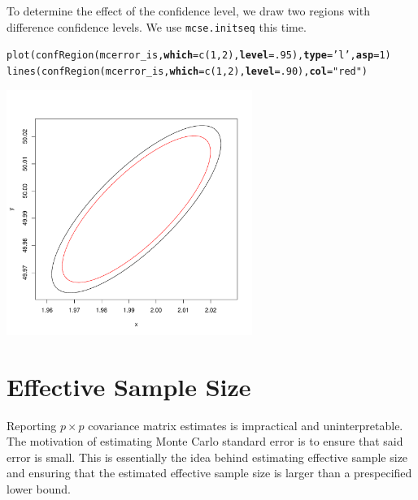 \documentclass[11pt]{article}\usepackage[]{graphicx}\usepackage[]{color}
\makeatletter
\def\maxwidth{ %
  \ifdim\Gin@nat@width>\linewidth
    \linewidth
  \else
    \Gin@nat@width
  \fi
}
\newcommand{\hlnum}[1]{\textcolor[rgb]{1,0.078,0.576}{#1}}%
\newcommand{\hlstr}[1]{\textcolor[rgb]{1,0.078,0.576}{#1}}%
\newcommand{\hlstd}[1]{\textcolor[rgb]{0,0,0}{#1}}%
\newcommand{\hlkwc}[1]{\textcolor[rgb]{0.412,0.412,0.412}{\textbf{#1}}}%
\newcommand{\hlkwd}[1]{\textcolor[rgb]{0,0,0.561}{#1}}%
\newenvironment{kframe}{%
 \def\at@end@of@kframe{}%
 \ifinner\ifhmode%
  \def\at@end@of@kframe{\end{minipage}}%
  \begin{minipage}{\columnwidth}%
 \fi\fi%
 \def\FrameCommand##1{\hskip\@totalleftmargin \hskip-\fboxsep
 \colorbox{shadecolor}{##1}\hskip-\fboxsep
     \hskip-\linewidth \hskip-\@totalleftmargin \hskip\columnwidth}%
 \MakeFramed {\advance\hsize-\width
   \@totalleftmargin\z@ \linewidth\hsize
   \@setminipage}}%
 {\par\unskip\endMakeFramed%
 \at@end@of@kframe}
\newenvironment{knitrout}{}{} %
\makeatother
\begin{document}
\bigskip
To determine the effect of the confidence level, we draw two regions with difference confidence levels. We use \texttt{mcse.initseq} this time.

\begin{knitrout}
\color{fgcolor}\begin{kframe}
\begin{alltt}
\hlkwd{plot}\hlstd{(}\hlkwd{confRegion}\hlstd{(mcerror_is,} \hlkwc{which} \hlstd{=} \hlkwd{c}\hlstd{(}\hlnum{1}\hlstd{,}\hlnum{2}\hlstd{),} \hlkwc{level} \hlstd{=} \hlnum{.95}\hlstd{),} \hlkwc{type} \hlstd{=} \hlstr{'l'}\hlstd{,} \hlkwc{asp} \hlstd{=} \hlnum{1}\hlstd{)}
\hlkwd{lines}\hlstd{(}\hlkwd{confRegion}\hlstd{(mcerror_is,} \hlkwc{which} \hlstd{=} \hlkwd{c}\hlstd{(}\hlnum{1}\hlstd{,}\hlnum{2}\hlstd{),} \hlkwc{level} \hlstd{=} \hlnum{.90}\hlstd{),} \hlkwc{col} \hlstd{=} \hlstr{"red"}\hlstd{)}
\end{alltt}
\end{kframe}
\includegraphics[width=\maxwidth,height=8cm]{figure/comp_region-1} 

\end{knitrout}

\section{Effective Sample Size}
Reporting $p \times p$ covariance matrix estimates is impractical and uninterpretable. The motivation of estimating Monte Carlo standard error is to ensure that said error is small. This is essentially the idea behind estimating effective sample size and ensuring that the estimated effective sample size is larger than a prespecified lower bound.
\end{document}
